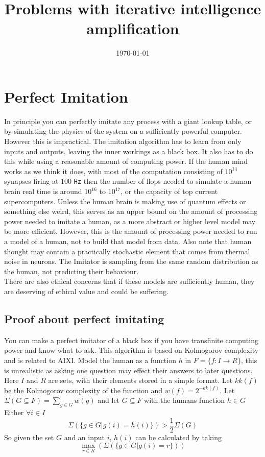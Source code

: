 \documentclass[12pt]{article}
\begin{document}
\title{Problems with iterative intelligence amplification}
 
\date{\today}
\section{Perfect Imitation}
In principle you can perfectly imitate any process with a giant lookup table, or by simulating the physics of the system on a sufficiently powerful computer. However this is impractical. The imitation algorithm has to learn from only inputs and outputs, leaving the inner workings as a black box. It also has to do this while using a reasonable amount of computing power. If the human mind works as we think it does, with most of the computation consisting of $10^{14}$ synapses firing at $100$ \texttt{Hz} then the number of flops needed to simulate a human brain real time is around $10^{16}$ to $10^{17}$, or the capacity of top current supercomputers. Unless the human brain is making use of quantum effects or something else weird, this serves as an upper bound on the amount of processing power needed to imitate a human, as a more abstract or higher level model may be more efficient. However, this is the amount of processing power needed to run a model of a human, not to build that model from data. Also note that human thought may contain a practically stochastic element that comes from thermal noise in neurons. The Imitator is sampling from the same random distribution as the human, not predicting their behaviour.\\
There are also ethical concerns that if these models are sufficiently human, they are deserving of ethical value and could be suffering. 
\subsection{Proof about perfect imitating}
You can make a perfect imitator of a black box if you have transfinite computing power and know what to ask. This algorithm is based on Kolmogorov complexity and is related to AIXI.
Model the human as a function $h$ in $F=\lbrace f:I\rightarrow R\rbrace$, this is unrealistic as asking one question may effect their answers to later questions. Here $I$ and $R$ are sets, with their elements stored in a simple format. Let $kk(f)$ be the Kolmogorov complexity of the function and $w(f)=2^{-kk(f)}$.
Let $\Sigma(G\subseteq F)=\sum_{g\in G}w(g)$ and
let $G\subseteq F$ with the humans function $h\in G$\\
Either $\forall i\in I$
$$\Sigma(\lbrace g\in G|g(i)=h(i)\rbrace) >\frac12\Sigma(G)$$
So given the set $G$ and an input $i$, $h(i)$ can be calculated by taking 
$$\max_{r\in R}(\Sigma(\lbrace g\in G|g(i)=r\rbrace))$$
\end{document}
